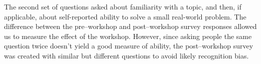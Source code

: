 \documentclass[10pt, twocolumn]{article}
\begin{document}
	
	
	The second set of questions asked about familiarity with a topic,
	and then,
	if applicable,
	about self-reported ability to solve a small real-world problem.
	The difference between the pre--workshop and post--workshop survey responses allowed us to measure the effect of the workshop.
	However, since asking people the same question twice doesn't yield a good measure of ability,
	the post--workshop survey was created with similar but different questions
    to avoid likely recognition bias.
\end{document}
